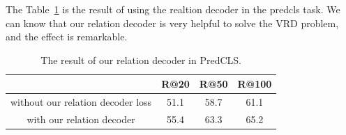 The Table~\ref{tab:result_relation_decoder} is the result of using the realtion decoder in the predcls task. We can know that our relation decoder is very helpful to solve the VRD problem, and the effect is remarkable.
\begin{table}[!h]
	\centering
	\begin{tabular}{c|ccc}
		\bottomrule
		& R@20    & R@50    & R@100      \\ \hline
		without our relation decoder  loss & 51.1    &58.7      & 61.1    \\
		with our relation decoder     & 55.4       & 63.3       & 65.2       \\ \bottomrule
	\end{tabular}
	
	\caption[The result of our relation decoder in PredCLS]{The result of our relation decoder in PredCLS.}
	\label{tab:result_relation_decoder}
\end{table}

%	
%	


